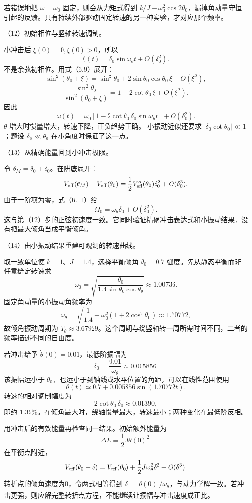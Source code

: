 \documentclass[12pt,a4paper,fontset=fandol]{ctexart}
\begin{document}
若错误地把 \(\omega=\omega_0\) 固定，则会从力矩式得到
\(k/J-\omega_0^2\cos2\theta_0\)，漏掉角动量守恒引起的反馈。只有持续外部驱动固定转速的另一种实验，才对应那个频率。

（12）初始相位与竖轴转速调制。

小冲击后 \(\xi(0)=0,\dot\xi(0)>0\)，所以 \[
\xi(t)=\delta_0\sin\omega_\theta t+O(\delta_0^2).
\] 不是余弦初相位。用式（6.9）展开： \[
\sin^2(\theta_0+\xi)
=\sin^2\theta_0+2\sin\theta_0\cos\theta_0\,\xi+O(\xi^2),
\] \[
\frac{\sin^2\theta_0}{\sin^2(\theta_0+\xi)}
=1-2\cot\theta_0\,\xi+O(\xi^2).
\] 因此 \[
\boxed{\omega(t)=
\omega_0[1-2\cot\theta_0\,\delta_0\sin\omega_\theta t]
+O(\delta_0^2).}\tag{6.14}
\] \(\theta\) 增大时惯量增大，转速下降，正负趋势正确。 小振动近似还要求
\(|\delta_0\cot\theta_0|\ll1\)；题设 \(\delta_0\ll\theta_0\)
在小角度时保证了这一点。

（13）从精确能量回到小冲击极限。

令 \(\theta_M=\theta_0+\delta_0\)。在阱底展开： \[
V_{\rm eff}(\theta_M)-V_{\rm eff}(\theta_0)
=\frac12V_{\rm eff}''(\theta_0)\delta_0^2+O(\delta_0^3).
\] 由于一阶项为零，式（6.11）给 \[
\Omega_0=\omega_\theta\delta_0+O(\delta_0^2).
\]
这与第（12）步的正弦初速度一致。它同时验证精确冲击表达式和小振动结果，没有把最大倾角当成平衡倾角。

（14）由小振动结果重建可观测的转速曲线。

取一致单位使 \(k=1\)、\(J=1.4\)，选择平衡倾角 \(\theta_0=0.7\)
弧度。先从静态平衡而非任意给定转速求 \[
\omega_0=\sqrt{\frac{\theta_0}{1.4\sin\theta_0\cos\theta_0}}
\approx1.00736.
\] 固定角动量的小振动角频率为 \[
\omega_\theta
=\sqrt{\frac1{1.4}+\omega_0^2(1+2\cos^2\theta_0)}
\approx1.70772,
\] 故倾角振动周期为
\(T_\theta\approx3.67929\)。这个周期与绕竖轴转一周所需时间不同，二者的频率描述不同的自由度。

若冲击给予 \(\dot\theta(0)=0.01\)，最低阶振幅为 \[
\delta_0=\frac{0.01}{\omega_\theta}\approx0.005856.
\] 该振幅远小于
\(\theta_0\)，也远小于到轴线或水平位置的角距，可以在线性范围使用 \[
\theta(t)\simeq0.7+0.005856\sin(1.70772t).
\] 转速的相对调制幅度为 \[
2\cot\theta_0\,\delta_0\approx0.01390,
\] 即约
\(1.39\%\)。在倾角最大时，绕轴惯量最大，转速最小；两种变化在最低阶反相。

用冲击后的有效能量再检查同一结果。初始额外能量为 \[
\Delta E=\frac12J\dot\theta(0)^2.
\] 在平衡点附近， \[
V_{\rm eff}(\theta_0+\delta)
=V_{\rm eff}(\theta_0)+\frac12J\omega_\theta^2\delta^2
+O(\delta^3).
\] 转折点的倾角速度为0，令两式相等得到
\(\delta=|\dot\theta(0)|/\omega_\theta\)，与动力学解一致。若冲击更强，则应解完整转折点方程，不能继续让振幅与冲击速度成正比。
\end{document}
